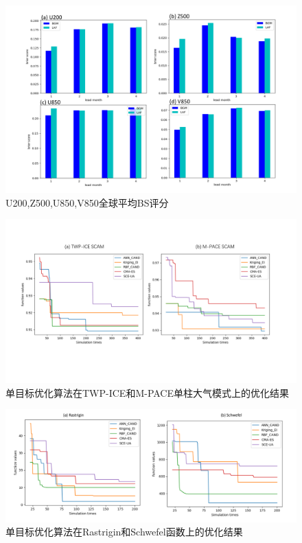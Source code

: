 \begin{figure}[H] %
  \centering
  \includegraphics[scale=0.45,trim=60 10 20 10,clip]{figures/allBrier.pdf}
  \caption{U200,Z500,U850,V850全球平均BS评分}
  \label{fig:BS}
\end{figure}




\begin{figure}[H] %
  \centering
  \includegraphics[scale=0.5,trim=10 100 10 85,clip]{figures/soallscam.pdf}
  \caption{单目标优化算法在TWP-ICE和M-PACE单柱大气模式上的优化结果}
  \label{fig:soscam}
\end{figure}

\begin{figure}[H] %
  \centering
  \includegraphics[scale=0.35,trim=0 10 10 10,clip]{figures/SOallfuction.pdf}
  \caption{单目标优化算法在Rastrigin和Schwefel函数上的优化结果}
  \label{fig:sofuction}
\end{figure}









